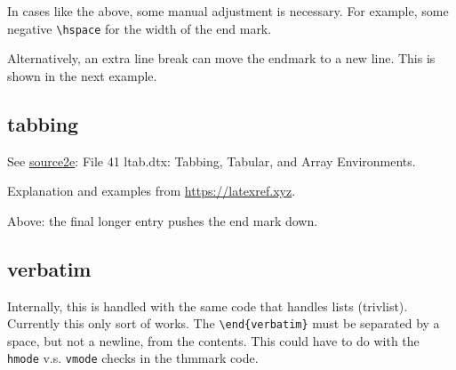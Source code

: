 In cases like the above, some manual adjustment is necessary.
For example, some negative \verb|\hspace| for the width of the end mark.

Alternatively, an extra line break can move the endmark to a new line.
This is shown in the next example.

\subsection{tabbing}

See \href{https://mirrors.ctan.org/macros/latex/base/source2e.pdf}{source2e}: File 41 ltab.dtx: Tabbing, Tabular, and Array Environments.

Explanation and examples from \url{https://latexref.xyz}.

Above: the final longer entry pushes the end mark down.

\subsection{verbatim}

Internally, this is handled with the same code that handles lists (trivlist).
Currently this only sort of works.
The \verb|\end{verbatim}| must be separated by a space, but not a newline, from the contents.
This could have to do with the \texttt{hmode} v.s. \texttt{vmode} checks in the thmmark code.


